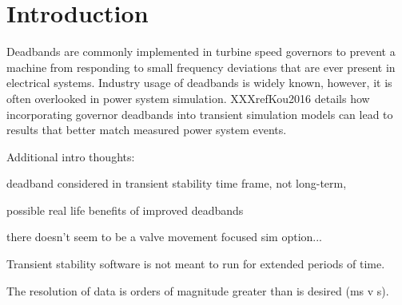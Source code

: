 \section{Introduction}
Deadbands are commonly implemented in turbine speed governors to prevent a machine from responding to small frequency deviations that are ever present in electrical systems.
Industry usage of deadbands is widely known, however, it is often overlooked in power system simulation.
XXXrefKou2016 details how incorporating governor deadbands into transient simulation models can lead to results that better match measured power system events.



Additional intro thoughts:

deadband considered in transient stability time frame, not long-term,

possible real life benefits of improved deadbands

there doesn't seem to be a valve movement focused sim option... 

Transient stability software is not meant to run for extended periods of time.

The resolution of data is orders of magnitude greater than is desired (ms v s).
